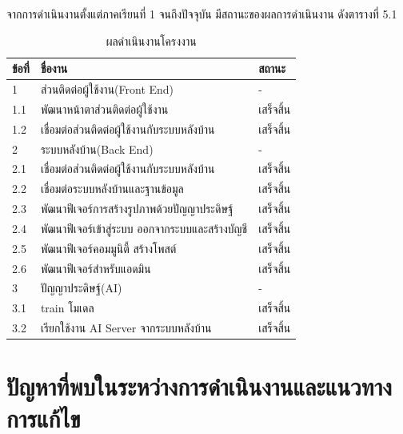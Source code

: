 \documentclass[12pt,oneside,openright,a4paper]{cpe-thai-project}
\begin{document}
\hspace{18pt}จากการดําเนินงานตั้งแต่ภาคเรียนที่ 1 จนถึงปัจจุบัน มีสถานะของผลการดําเนินงาน ดังตารางที่ 5.1
\begin{table}[!h]
  \caption{ผลดําเนินงานโครงงาน}\label{tbl:project-results}
  \begin{tabular}{|p{3cm}|p{6cm}|p{4cm}|}
    \hline
    \textbf{ข้อที่} & \textbf{ชื่องาน}                         & \textbf{สถานะ} \\
    \hline
    1            & ส่วนติดต่อผู้ใช้งาน(Front End)               & -              \\
    \hline
    1.1          & พัฒนาหน้าตาส่วนติดต่อผู้ใช้งาน                 & เสร็จสิ้น         \\
    \hline
    1.2          & เชื่อมต่อส่วนติดต่อผู้ใช้งานกับระบบหลังบ้าน        & เสร็จสิ้น         \\
    \hline
    2            & ระบบหลังบ้าน(Back End)                   & -              \\
    \hline
    2.1          & เชื่อมต่อส่วนติดต่อผู้ใช้งานกับระบบหลังบ้าน        & เสร็จสิ้น         \\
    \hline
    2.2          & เชื่อมต่อระบบหลังบ้านและฐานข้อมูล             & เสร็จสิ้น         \\
    \hline
    2.3          & พัฒนาฟีเจอร์การสร้างรูปภาพด้วยปัญญาประดิษฐ์     & เสร็จสิ้น         \\
    \hline
    2.4          & พัฒนาฟีเจอร์เข้าสู่ระบบ ออกจากระบบและสร้างบัญชี & เสร็จสิ้น         \\
    \hline
    2.5          & พัฒนาฟีเจอร์คอมมูนิตี้ สร้างโพสต์               & เสร็จสิ้น         \\
    \hline
    2.6          & พัฒนาฟีเจอร์สำหรับแอดมิน                     & เสร็จสิ้น         \\
    \hline
    3            & ปัญญาประดิษฐ์(AI)                         & -              \\
    \hline
    3.1          & train โมเดล                            & เสร็จสิ้น         \\
    \hline
    3.2          & เรียกใช้งาน AI Server จากระบบหลังบ้าน      & เสร็จสิ้น         \\
    \hline
  \end{tabular}
\end{table}
\vspace{\fill}\clearpage
\section{ปัญหาที่พบในระหว่างการดําเนินงานและแนวทางการแก้ไข}
\end{document}
